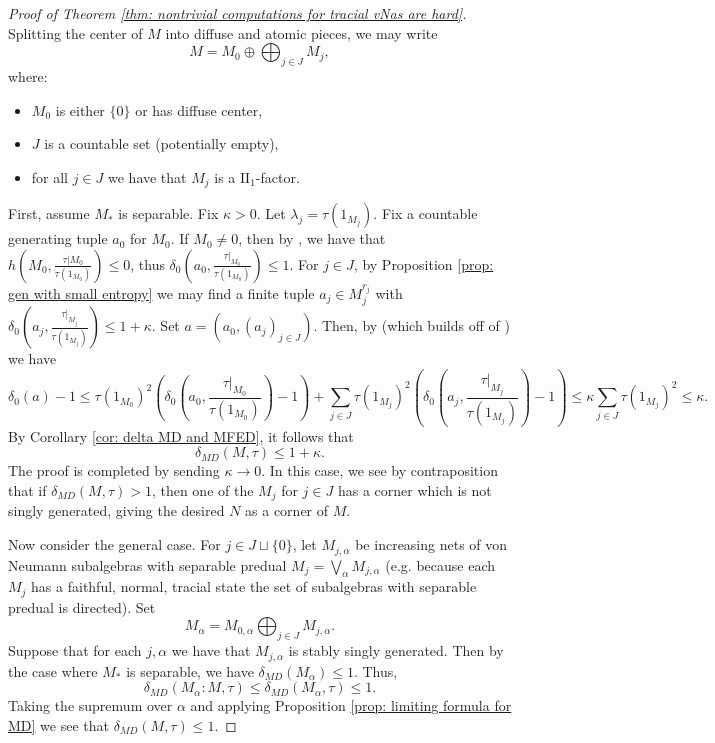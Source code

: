 \documentclass[10pt]{amsart}
\theoremstyle{definition}
\numberwithin{equation}{section}
\begin{document}
\begin{proof}[Proof of Theorem \ref{thm: nontrivial computations for tracial vNas are hard}]
Splitting the center of $M$ into diffuse and atomic pieces, we may write 
\[M=M_{0}\oplus \bigoplus_{j\in J}M_{j},\]
where:
\begin{itemize}
    \item $M_{0}$ is either $\{0\}$ or has diffuse center,
    \item $J$ is a countable set (potentially empty),
    \item for all $j\in J$ we have that $M_{j}$ is a $\textrm{II}_{1}$-factor.
\end{itemize}

First, assume $M_{*}$ is separable. 
Fix $\kappa>0$.
Let $\lambda_{j}=\tau(1_{M_{j}})$. Fix a countable generating tuple $a_{0}$ for $M_{0}$. If $M_{0}\ne 0$, then by \cite[Example 3]{FreePinsker}, we have that $h(M_{0},\frac{\tau|M_{0}}{\tau(1_{M_{0}})})\leq 0$, thus $\delta_{0}(a_{0},\frac{\tau|_{M_{0}}}{\tau(1_{M_{0}})})\leq 1$.
For $j\in J$, by Proposition \ref{prop: gen with small entropy} we may find a finite tuple $a_{j}\in M_{j}^{r_{j}}$ with $\delta_{0}\left(a_{j},\frac{\tau|_{M_{j}}}{\tau(1_{M_{j}})}\right)\leq 1+\kappa$. 
Set $a=(a_{0},(a_{j})_{j\in J})$. Then, by \cite[Lemma 4.8]{HJKEPropT} (which builds off of \cite[Lemma 3.2 and Corollary 4.3]{JungHyperFiniteIneq}) we have 
\[\delta_{0}(a)-1\leq \tau(1_{M_{0}})^{2}\left(\delta_{0}\left(a_{0},\frac{\tau|_{M_{0}}}{\tau(1_{M_{0}})}\right)-1\right)+\sum_{j\in J}\tau(1_{M_{j}})^{2}\left(\delta_{0}\left(a_{j},\frac{\tau|_{M_{j}}}{\tau(1_{M_{j}})}\right)-1\right)\leq \kappa\sum_{j\in J}\tau(1_{M_{j}})^{2}\leq \kappa.\]
By Corollary \ref{cor: delta MD and MFED}, it follows that
\[\delta_{MD}(M,\tau)\leq 1+\kappa.\]
The proof is completed by sending $\kappa\to 0$. In this case, we see by contraposition that if $\delta_{MD}(M,\tau)>1$, then one of the $M_{j}$ for $j\in J$ has a corner which is not singly generated, giving the desired $N$ as a corner of $M$.

Now consider the general case. For $j\in J\sqcup\{0\}$, let $M_{j,\alpha}$ be increasing nets of von Neumann subalgebras with separable predual $M_{j}=\bigvee_{\alpha}M_{j,\alpha}$ (e.g. because each $M_{j}$ has a faithful, normal, tracial state the set of subalgebras with separable predual is directed). Set 
\[M_{\alpha}=M_{0,\alpha}\bigoplus_{j\in J}M_{j,\alpha}.\]
Suppose that for each $j,\alpha$ we have that $M_{j,\alpha}$ is stably singly generated. Then by the case where $M_{*}$ is separable, we have $\delta_{MD}(M_{\alpha})\leq 1$. Thus,
\[\delta_{MD}(M_{\alpha}:M,\tau)\leq \delta_{MD}(M_{\alpha},\tau)\leq 1.\]
Taking the supremum over $\alpha$ and applying Proposition \ref{prop: limiting formula for MD} we see that $\delta_{MD}(M,\tau)\leq 1$. 






\end{proof}
\end{document}
